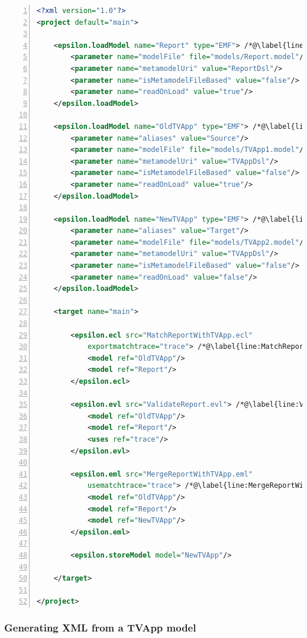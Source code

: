 \begin{lstlisting}[float=tbp, basicstyle=\ttfamily\footnotesize, flexiblecolumns=true, numbers=left, nolol=true, caption=Workflow integrating the comparison\, validation and merging steps, label=lst:CaseStudyMergingWorkflow, language=XML, tabsize=2]
<?xml version="1.0"?>
<project default="main">
	
	<epsilon.loadModel name="Report" type="EMF"> /*@\label{line:LoadReportTask}@*/
		<parameter name="modelFile" file="models/Report.model"/>
		<parameter name="metamodelUri" value="ReportDsl"/>
		<parameter name="isMetamodelFileBased" value="false"/>
		<parameter name="readOnLoad" value="true"/>
	</epsilon.loadModel>
	
	<epsilon.loadModel name="OldTVApp" type="EMF"> /*@\label{line:LoadOldTVAppTask}@*/
		<parameter name="aliases" value="Source"/>
		<parameter name="modelFile" file="models/TVApp1.model"/>
		<parameter name="metamodelUri" value="TVAppDsl"/>
		<parameter name="isMetamodelFileBased" value="false"/>
		<parameter name="readOnLoad" value="true"/>
	</epsilon.loadModel>	
	
	<epsilon.loadModel name="NewTVApp" type="EMF"> /*@\label{line:LoadNewTVAppTask}@*/
		<parameter name="aliases" value="Target"/>
		<parameter name="modelFile" file="models/TVApp2.model"/>
		<parameter name="metamodelUri" value="TVAppDsl"/>
		<parameter name="isMetamodelFileBased" value="false"/>
		<parameter name="readOnLoad" value="false"/>
	</epsilon.loadModel>

	<target name="main">
		
		<epsilon.ecl src="MatchReportWithTVApp.ecl" 
			exportmatchtrace="trace"> /*@\label{line:MatchReportWithTVAppTask}@*/
			<model ref="OldTVApp"/>
			<model ref="Report"/>
		</epsilon.ecl>
		
		<epsilon.evl src="ValidateReport.evl"> /*@\label{line:ValidateReportTask}@*/
			<model ref="OldTVApp"/>
			<model ref="Report"/>
			<uses ref="trace"/>
		</epsilon.evl>
		
		<epsilon.eml src="MergeReportWithTVApp.eml" 
			usematchtrace="trace"> /*@\label{line:MergeReportWithTVAppTask}@*/
			<model ref="OldTVApp"/>
			<model ref="Report"/>
			<model ref="NewTVApp"/>
		</epsilon.eml>
		
		<epsilon.storeModel model="NewTVApp"/>
		
	</target>
	
</project>
\end{lstlisting}

\subsubsection{Generating XML from a TVApp model}
\label{sec:GeneratingXML}


